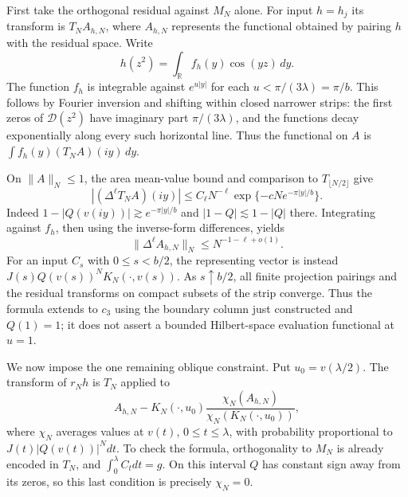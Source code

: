 First take the orthogonal residual against $M_N$ alone.  For input
$h=h_j$ its transform is $T_NA_{h,N}$, where $A_{h,N}$ represents the
functional obtained by pairing $h$ with the residual space.  Write
\[
 h(z^2)=\int_{\mathbb R}f_h(y)\cos(yz)\,dy.
\]
The function $f_h$ is integrable against $e^{u|y|}$ for each
$u<\pi/(3\lambda)=\pi/b$.  This follows by Fourier inversion and
shifting within closed narrower strips: the first zeros of
$\mathcal D(z^2)$ have imaginary part $\pi/(3\lambda)$, and the
functions decay exponentially along every such horizontal line.
Thus the functional on $A$ is
$\int f_h(y)(T_NA)(iy)\,dy$.

On $\|A\|_N\le1$, the area mean-value bound and comparison to
$T_{\lfloor N/2\rfloor}$ give
\[
 |(\Delta^\ell T_NA)(iy)|
 \le C_\ell N^{-\ell}
       \exp\{-cNe^{-\pi|y|/b}\}.
\]
Indeed $1-|Q(v(iy))|\gtrsim e^{-\pi|y|/b}$ and
$|1-Q|\lesssim1-|Q|$ there.  Integrating against $f_h$, then using
the inverse-form differences, yields
\begin{equation}\label{c:h-vector-bound}
 \|\Delta^\ell A_{h,N}\|_N\le N^{-1-\ell+o(1)}.
\end{equation}
For an input $C_s$ with $0\le s<b/2$, the representing vector is
instead $J(s)Q(v(s))^NK_N(\cdot,v(s))$.  As $s\uparrow b/2$, all
finite projection pairings and the residual transforms on compact
subsets of the strip converge.  Thus the formula extends to $c_3$
using the boundary column just constructed and $Q(1)=1$; it does not
assert a bounded Hilbert-space evaluation functional at $u=1$.

We now impose the one remaining oblique constraint.  Put
$u_0=v(\lambda/2)$.  The transform of $r_Nh$ is $T_N$ applied to
\begin{equation}\label{c:oblique-vector}
 A_{h,N}-K_N(\cdot,u_0)
       \frac{\chi_N(A_{h,N})}{\chi_N(K_N(\cdot,u_0))},
\end{equation}
where $\chi_N$ averages values at $v(t)$, $0\le t\le\lambda$,
with probability proportional to $J(t)|Q(v(t))|^Ndt$.
To check the formula, orthogonality to $M_N$ is already encoded in
$T_N$, and $\int_0^\lambda C_tdt=g$.  On this interval $Q$ has
constant sign away from its zeros, so this last condition is precisely
$\chi_N=0$.


